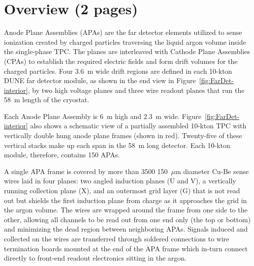 \section{Overview (2 pages)}
\label{sec:fdsp-apa-intro}



Anode Plane Assemblies (APAs) are the far detector elements utilized to sense ionization created by charged particles traversing the liquid argon volume inside the single-phase TPC.  The planes are interleaved with Cathode Plane Assemblies (CPAs) to establish the required electric fields and form drift volumes for the charged particles. Four 3.6~m wide drift regions are defined in each 10-kton DUNE far detector module, as shown in the end view in Figure~\ref{fig:FarDet-interior}, by two high voltage planes and three wire readout planes that run the 58~m length of the cryostat. 

Each Anode Plane Assembly is 6~m high and 2.3~m wide.  Figure~\ref{fig:FarDet-interior} also shows a schematic view of a partially assembled 10-kton TPC with vertically double hung anode plane frames (shown in red).  Twenty-five of these vertical stacks make up each span in the 58~m long detector.  Each 10-kton module, therefore, contains 150 APAs.

A single APA frame is covered by more than 3500 150~$\mu$m diameter Cu-Be sense wires laid in four planes: two angled induction planes (U and V), a vertically running collection plane (X), and an outermost grid layer (G) that is not read out but shields the first induction plane from charge as it approaches the grid in the argon volume.  The wires are wrapped around the frame from one side to the other, allowing all channels to be read out from one end only (the top or bottom) and minimizing the dead region between neighboring APAs. 
Signals induced and collected on the wires are transferred through soldered connections to wire termination boards mounted at the end of the APA frame which in-turn connect directly to front-end readout electronics sitting in the argon. %

